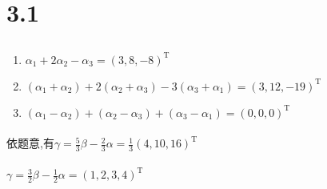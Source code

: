 \section{3.1}
 \subsection{} %
	 \paragraph{} %
		 \begin{enumerate}
			 \item %
			       \( \alpha_{1} + 2\alpha_{2} - \alpha_{3} = (3, 8, -8)^{\mathrm{T}} \)
			 \item %
			       \( (\alpha_{1} + \alpha_{2}) + 2(\alpha_{2} + \alpha_{3}) - 3(\alpha_{3} + \alpha_{1}) = (3, 12, -19)^{\mathrm{T}} \)
			 \item %
			       \( (\alpha_{1} - \alpha_{2}) + (\alpha_{2} - \alpha_{3}) + (\alpha_{3} - \alpha_{1}) = (0, 0, 0)^{\mathrm{T}} \)
		 \end{enumerate}


	 \paragraph{} %
		 依题意,有\(  \gamma = \frac{5}{3}\beta - \frac{2}{3}\alpha = \frac{1}{3}(4, 10, 16)^{\mathrm{T}} \)


	 \paragraph{} %
		 \(\gamma = \frac{3}{2}\beta - \frac{1}{2}\alpha = (1, 2, 3, 4)^{\mathrm{T}}\)


